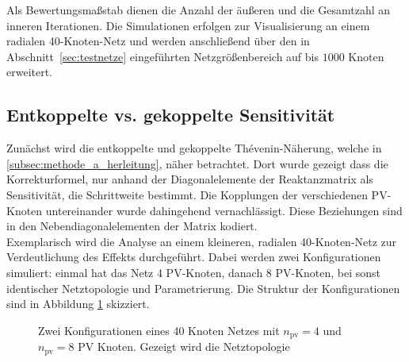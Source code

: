
Als Bewertungsmaßstab dienen die Anzahl der äußeren und die Gesamtzahl an inneren Iterationen. 
Die Simulationen erfolgen zur Visualisierung an einem radialen 40-Knoten-Netz und werden anschließend über den in Abschnitt~\ref{sec:testnetze} eingeführten Netzgrößenbereich auf bis $1000$ Knoten erweitert.


\subsection{Entkoppelte vs. gekoppelte Sensitivität}
\label{subsec:Konvergenz der äußeren Schleife: Entkoppelte Sensitivität}

Zunächst wird die entkoppelte und gekoppelte Thévenin-Näherung, welche in \cref{subsec:methode_a_herleitung}, näher betrachtet. 
Dort wurde gezeigt dass die Korrekturformel, nur anhand der Diagonalelemente der Reaktanzmatrix als Sensitivität, die Schrittweite bestimmt.
Die Kopplungen der verschiedenen PV-Knoten untereinander wurde dahingehend vernachlässigt.
Diese Beziehungen sind in den Nebendiagonalelementen der Matrix kodiert. \\

Exemplarisch wird die Analyse an einem kleineren, radialen 40-Knoten-Netz zur Verdeutlichung des Effekts durchgeführt.
Dabei werden zwei Konfigurationen simuliert: einmal hat das Netz 4 PV-Knoten, danach 8 PV-Knoten, bei sonst identischer Netztopologie und Parametrierung.
Die Struktur der Konfigurationen sind in Abbildung \ref{fig:radial_networks_convergence} skizziert.

\begin{figure}[htbp]
	\centering
	
	\caption{Zwei Konfigurationen eines 40 Knoten Netzes mit $n_\mathrm{pv}=4$ und $n_\mathrm{pv}=8$ PV Knoten. Gezeigt wird die Netztopologie}
	\label{fig:radial_networks_convergence}
\end{figure}

